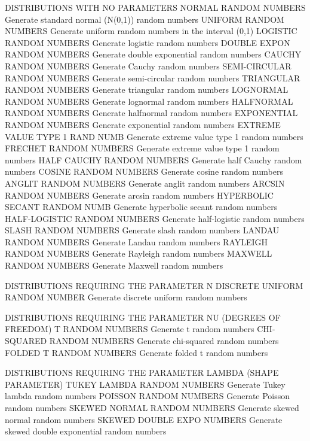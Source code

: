 DISTRIBUTIONS WITH NO PARAMETERS
   NORMAL RANDOM NUMBERS          Generate standard normal (N(0,1))
                                  random numbers
   UNIFORM RANDOM NUMBERS         Generate uniform random numbers in
                                  the interval (0,1)
   LOGISTIC RANDOM NUMBERS        Generate logistic random numbers
   DOUBLE EXPON RANDOM NUMBERS    Generate double exponential random
                                  numbers
   CAUCHY RANDOM NUMBERS          Generate Cauchy random numbers
   SEMI-CIRCULAR RANDOM NUMBERS   Generate semi-circular random numbers
   TRIANGULAR RANDOM NUMBERS      Generate triangular random numbers
   LOGNORMAL RANDOM NUMBERS       Generate lognormal random numbers
   HALFNORMAL RANDOM NUMBERS      Generate halfnormal random numbers
   EXPONENTIAL RANDOM NUMBERS     Generate exponential random numbers
   EXTREME VALUE TYPE 1 RAND NUMB Generate extreme value type 1 random
                                  numbers
   FRECHET RANDOM NUMBERS         Generate extreme value type 1 random
                                  numbers
   HALF CAUCHY RANDOM NUMBERS     Generate half Cauchy random numbers
   COSINE RANDOM NUMBERS          Generate cosine random numbers
   ANGLIT RANDOM NUMBERS          Generate anglit random numbers
   ARCSIN RANDOM NUMBERS          Generate arcsin random numbers
   HYPERBOLIC SECANT RANDOM NUMB  Generate hyperbolic secant random
                                  numbers
   HALF-LOGISTIC RANDOM NUMBERS   Generate half-logistic random
                                  numbers
   SLASH RANDOM NUMBERS           Generate slash random numbers
   LANDAU RANDOM NUMBERS          Generate Landau random numbers
   RAYLEIGH RANDOM NUMBERS        Generate Rayleigh random numbers
   MAXWELL RANDOM NUMBERS         Generate Maxwell random numbers
 
DISTRIBUTIONS REQUIRING THE PARAMETER N
   DISCRETE UNIFORM RANDOM NUMBER Generate discrete uniform random
                                  numbers
 
DISTRIBUTIONS REQUIRING THE PARAMETER NU (DEGREES OF FREEDOM)
   T RANDOM NUMBERS               Generate t random numbers
   CHI-SQUARED RANDOM NUMBERS     Generate chi-squared random numbers
   FOLDED T RANDOM NUMBERS        Generate folded t random numbers
 
DISTRIBUTIONS REQUIRING THE PARAMETER LAMBDA (SHAPE PARAMETER)
   TUKEY LAMBDA RANDOM NUMBERS    Generate Tukey lambda random numbers
   POISSON RANDOM NUMBERS         Generate Poisson random numbers
   SKEWED NORMAL RANDOM NUMBERS   Generate skewed normal random
                                  numbers
   SKEWED DOUBLE EXPO NUMBERS     Generate skewed double exponential
                                  random numbers

